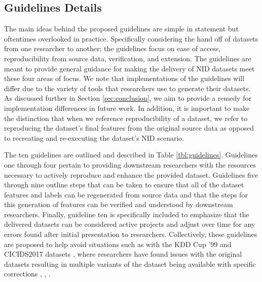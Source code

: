 \documentclass[sigconf, anonymous, screen, review]{acmart}
\begin{document}
\subsection{Guidelines Details}\label{subsec:framework_overview}
The main ideas behind the proposed guidelines are simple in statement but oftentimes overlooked in practice.
Specifically considering the hand off of datasets from one researcher to another; the guidelines focus on ease of access, reproducibility from source data, verification, and extension.
The guidelines are meant to provide general guidance for making the delivery of NID datasets meet these four areas of focus.
We note that implementations of the guidelines will differ due to the variety of tools that researchers use to generate their datasets.
As discussed further in Section \ref{sec:conclusion}, we aim to provide a remedy for implementation differences in future work.
In addition, it is important to make the distinction that when we reference reproducibility of a dataset, we refer to reproducing the dataset's final features from the original source data as opposed to recreating and re-executing the dataset's NID scenario.

The ten guidelines are outlined and described in Table \ref{tbl:guidelines}.
Guidelines one through four pertain to providing downstream researchers with the resources necessary to actively reproduce and enhance the provided dataset.
Guidelines five through nine outline steps that can be taken to ensure that all of the dataset features and labels can be regenerated from source data and that the steps for this generation of features can be verified and understood by downstream researchers.
Finally, guideline ten is specifically included to emphasize that the delivered datasets can be considered active projects and adjust over time for any errors found after initial presentation to researchers.
Collectively, these guidelines are proposed to help avoid situations such as with the KDD Cup '99 \cite{kdd99} and CICIDS2017 datasets \cite{sharafaldin2018toward}, where researchers have found issues with the original datasets resulting in multiple variants of the dataset being available with specific corrections \cite{tavallaee2009detailed}, \cite{lanvin:hal-03775466}, \cite{engelen2021}.
\end{document}
